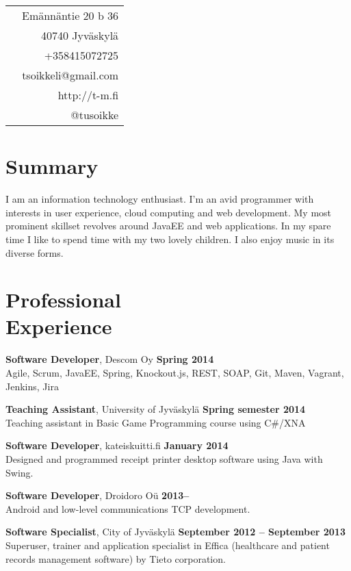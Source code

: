 \documentclass[margin,line]{resume}
\begin{document}
\begin{resume}

\hfill 
\begin{tabular}{l r}
  & Emännäntie 20 b 36 \\
  & 40740 Jyväskylä \\
  & +358415072725 \\
  & tsoikkeli@gmail.com \\
  & http://t-m.fi \\
  & @tusoikke 
\end{tabular}



 
\section{\mysidestyle Summary}
I am an information technology enthusiast. I'm an avid programmer with interests in user experience, cloud computing and web development. My most prominent skillset revolves around JavaEE and web applications. In my spare time I like to spend time with my two lovely children. I also enjoy music in its diverse forms.

\section{\mysidestyle Professional\\Experience}

\textbf{Software Developer}, Descom Oy
\hfill\textbf{Spring 2014}\\
Agile, Scrum, JavaEE, Spring, Knockout.js, REST, SOAP, Git, Maven, Vagrant, Jenkins, Jira

\textbf{Teaching Assistant}, University of Jyväskylä  
\hfill\textbf{Spring semester 2014} \\
Teaching assistant in Basic Game Programming course using C\#/XNA

\textbf{Software Developer}, kateiskuitti.fi
\hfill\textbf{January 2014} \\
Designed and programmed receipt printer desktop software using Java with Swing.

\textbf{Software Developer}, Droidoro Oü
\hfill\textbf{2013--}\\
Android and low-level communications TCP development.

\textbf{Software Specialist}, City of Jyväskylä
\hfill\textbf{September 2012 -- September 2013}\\
Superuser, trainer and application specialist in Effica (healthcare and patient records management software) by Tieto corporation.


\end{resume}
\end{document}
